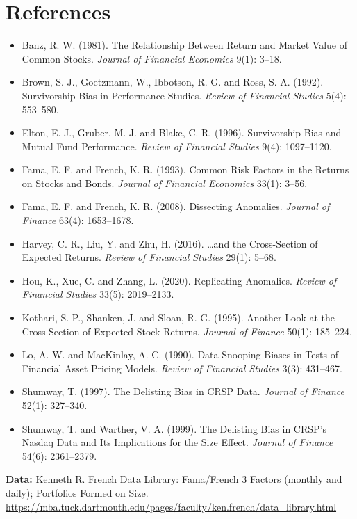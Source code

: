 \section*{References}

\begin{itemize}
  \item Banz, R. W. (1981). The Relationship Between Return and Market Value of Common Stocks. \emph{Journal of Financial Economics} 9(1): 3--18.
  \item Brown, S. J., Goetzmann, W., Ibbotson, R. G. and Ross, S. A. (1992). Survivorship Bias in Performance Studies. \emph{Review of Financial Studies} 5(4): 553--580.
  \item Elton, E. J., Gruber, M. J. and Blake, C. R. (1996). Survivorship Bias and Mutual Fund Performance. \emph{Review of Financial Studies} 9(4): 1097--1120.
  \item Fama, E. F. and French, K. R. (1993). Common Risk Factors in the Returns on Stocks and Bonds. \emph{Journal of Financial Economics} 33(1): 3--56.
  \item Fama, E. F. and French, K. R. (2008). Dissecting Anomalies. \emph{Journal of Finance} 63(4): 1653--1678.
  \item Harvey, C. R., Liu, Y. and Zhu, H. (2016). \ldots and the Cross-Section of Expected Returns. \emph{Review of Financial Studies} 29(1): 5--68.
  \item Hou, K., Xue, C. and Zhang, L. (2020). Replicating Anomalies. \emph{Review of Financial Studies} 33(5): 2019--2133.
  \item Kothari, S. P., Shanken, J. and Sloan, R. G. (1995). Another Look at the Cross-Section of Expected Stock Returns. \emph{Journal of Finance} 50(1): 185--224.
  \item Lo, A. W. and MacKinlay, A. C. (1990). Data-Snooping Biases in Tests of Financial Asset Pricing Models. \emph{Review of Financial Studies} 3(3): 431--467.
  \item Shumway, T. (1997). The Delisting Bias in CRSP Data. \emph{Journal of Finance} 52(1): 327--340.
  \item Shumway, T. and Warther, V. A. (1999). The Delisting Bias in CRSP's Nasdaq Data and Its Implications for the Size Effect. \emph{Journal of Finance} 54(6): 2361--2379.
\end{itemize}

\textbf{Data:} Kenneth R. French Data Library: Fama/French 3 Factors (monthly and daily); Portfolios Formed on Size. \url{https://mba.tuck.dartmouth.edu/pages/faculty/ken.french/data_library.html}
